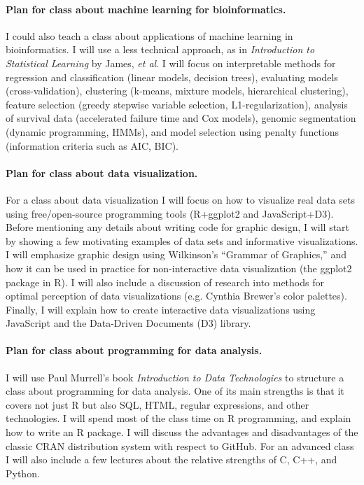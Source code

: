 \documentclass{article}
\begin{document}
\paragraph{Plan for class about machine learning for bioinformatics.}
I could also teach a class about applications of machine learning in
bioinformatics. I will use a less technical approach, as in
\emph{Introduction to Statistical Learning} by James, \emph{et al}. I
will focus on interpretable methods for regression and classification
(linear models, decision trees), evaluating models (cross-validation),
clustering (k-means, mixture models, hierarchical clustering), feature
selection (greedy stepwise variable selection, L1-regularization),
analysis of survival data (accelerated failure time and Cox models),
genomic segmentation (dynamic programming, HMMs), and model selection
using penalty functions (information criteria such as AIC, BIC).

\paragraph{Plan for class about data visualization.} For a class about
data visualization I will focus on how to visualize real data sets
using free/open-source programming tools (R+ggplot2 and
JavaScript+D3). Before mentioning any details about writing code for
graphic design, I will start by showing a few motivating examples of
data sets and informative visualizations. I will emphasize graphic
design using Wilkinson’s ``Grammar of Graphics,'' and how it can be
used in practice for non-interactive data visualization (the ggplot2
package in R). I will also include a discussion of research into
methods for optimal perception of data visualizations (e.g. Cynthia
Brewer’s color palettes). Finally, I will explain how to create
interactive data visualizations using JavaScript and the Data-Driven
Documents (D3) library.

\paragraph{Plan for class about programming for data analysis.} I will
use Paul Murrell's book \emph{Introduction to Data Technologies} to
structure a class about programming for data analysis. One of its main
strengths is that it covers not just R but also SQL, HTML, regular
expressions, and other technologies. I will spend most of the class
time on R programming, and explain how to write an R package. I will
discuss the advantages and disadvantages of the classic CRAN
distribution system with respect to GitHub. For an advanced class I
will also include a few lectures about the relative strengths of C,
C++, and Python.
\end{document}
